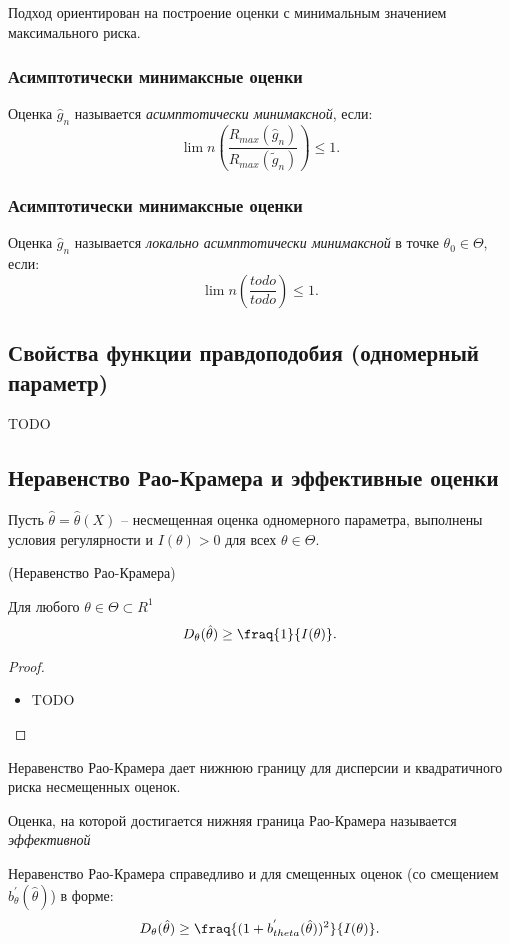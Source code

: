 Подход ориентирован на построение оценки с минимальным значением максимального риска.

\subsubsection{Асимптотически минимаксные оценки}
\begin{definition}
	Оценка $\hat{g}_{n}$ называется \textit{асимптотически минимаксной}, если:
	\[
		\lim{n}(\frac{R_{max}(\hat{g}_n)}{R_{max}(\tilde{g}_n)}) \leq 1
	.\]
\end{definition}

\subsubsection{Асимптотически минимаксные оценки}
\begin{definition}
	Оценка $\hat{g}_{n}$ называется \textit{локально асимптотически минимаксной} в точке $\theta_{0} \in \Theta$, если:
	\[
		\lim{n}(\frac{todo}{todo}) \leq 1
	.\]
\end{definition}

\subsection{Свойства функции правдоподобия (одномерный параметр)}
TODO

\subsection{Неравенство Рао-Крамера и эффективные оценки}
Пусть $\hat{\theta} = \hat{\theta}(X)$ -- несмещенная оценка одномерного параметра, выполнены условия регулярности и $I(\theta) > 0$ для всех $\theta \in \Theta$.

\begin{theorem}(Неравенство Рао-Крамера)

	Для любого $\theta \in \Theta \subset R^{1}$
	\[
		D_{\theta}(\hat{\theta}) \geq \fraq{1}{I(\theta)}
	.\]
\end{theorem}
\begin{proof}
	\enewline
        \begin{itemize}
		\item TODO
	\end{itemize}
\end{proof}

Неравенство Рао-Крамера дает нижнюю границу для дисперсии и квадратичного риска несмещенных оценок.

\begin{definition}
	Оценка, на которой достигается нижняя граница Рао-Крамера называется \textit{эффективной}
\end{definition}

\begin{remark}
	Неравенство Рао-Крамера справедливо и для смещенных оценок (со смещением $b^{'}_{\theta}(\hat{\theta})$) в форме:
	\[
		D_{\theta}(\hat{\theta}) \geq \fraq{(1 + b^{'}_{theta}(\hat{\theta}))^2}{I(\theta)}
	.\]
\end{remark}
